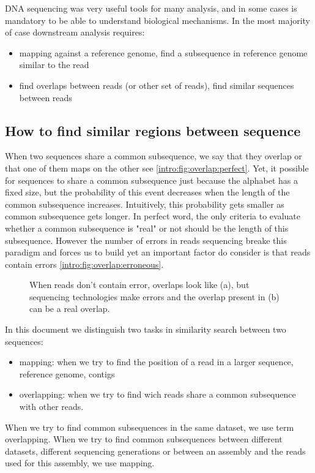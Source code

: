 \documentclass[./main.tex]{subfiles}
\begin{document}
DNA sequencing was very useful tools for many analysis, and in some cases is mandatory to be able to understand biological mechanisms. 
In the most majority of case downstream analysis requires:
\begin{itemize}
    \item mapping against a reference genome, find a subsequence in reference genome similar to the read
    \item find overlaps between reads (or other set of reads), find similar sequences between reads 
\end{itemize}
 
\subsection{How to find similar regions between sequence} 

When two sequences share a common subsequence, we say that they overlap or that one of them maps on the other see \ref{intro:fig:overlap:perfect}. Yet, it possible for sequences to share a common subsequence just because the alphabet has a fixed size, but the probability of this event decreases when the length of the common subsequence increases. Intuitively, this probability gets smaller as common subsequence gets longer. In perfect word, the only criteria to evaluate whether a common subsequence is "real" or not should be the length of this subsequence. However the number of errors in reads sequencing breake this paradigm and forces us to build yet an important factor do consider is that reads contain errors \ref{intro:fig:overlap:erroneous}.

\begin{figure}[ht]
    \centering
    \caption{When reads don't contain error, overlaps look like (a), but sequencing technologies make errors and the overlap present in (b) can be a real overlap.}
    \label{intro:fig:overlap}
\end{figure}

In this document we distinguish two tasks in similarity search between two sequences:
\begin{itemize}
    \item mapping: when we try to find the position of a read in a larger sequence, reference genome, contigs
    \item overlapping: when we try to find wich reads share a common subsequence with other reads. 
\end{itemize}
When we try to find common subsequences in the same dataset, we use term overlapping. When we try to find common subsequences between different datasets, different sequencing generations or between an assembly and the reads used for this assembly, we use mapping.
\end{document}
